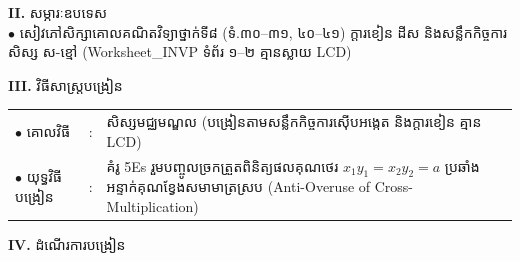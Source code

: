 \documentclass[a4paper,10pt]{article}
\newcommand{\en}[1]{{\TimesEn #1}}
\begin{document}
{%
\textbf{II.} {\muol សម្ភារៈឧបទេស}\\[1pt]
\hspace*{0.55cm}$\bullet$ \hspace{0.35cm} សៀវភៅសិក្សាគោលគណិតវិទ្យាថ្នាក់ទី៨ (ទំ.៣០–៣១, ៤០–៤១) ក្ដារខៀន ដីស និងសន្លឹកកិច្ចការសិស្ស ស-ខ្មៅ (\en{Worksheet\_INVP} ទំព័រ ១–២ គ្មានស្លាយ \en{LCD})

\vspace{2pt}

\textbf{III.} {\muol វិធីសាស្រ្តបង្រៀន}\\[1pt]
\hspace*{0.45cm}%
\begin{tabular}{@{}l l L{14.85cm}@{}}
  $\bullet$ \hspace{0.25cm} គោលវិធី & : & សិស្សមជ្ឈមណ្ឌល (បង្រៀនតាមសន្លឹកកិច្ចការស៊ើបអង្កេត និងក្ដារខៀន គ្មាន \en{LCD}) \\
  $\bullet$ \hspace{0.25cm} យុទ្ធវិធីបង្រៀន & : & គំរូ \en{5Es} រួមបញ្ចូលច្រកត្រួតពិនិត្យផលគុណថេរ $x_1 y_1 = x_2 y_2 = a$ ប្រឆាំងអន្ទាក់គុណខ្វែងសមាមាត្រស្រប (\en{Anti-Overuse of Cross-Multiplication}) \\
\end{tabular}
}

\vspace{2pt}

\textbf{IV.} {\muol ដំណើរការបង្រៀន}

\vspace{1pt}
\end{document}
